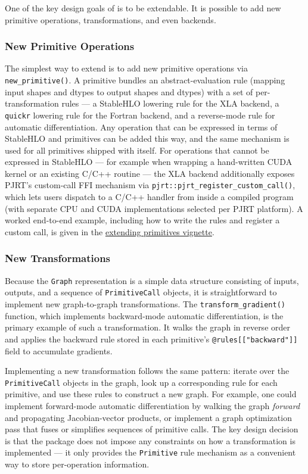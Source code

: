 One of the key design goals of  is to be extendable.
It is possible to add new primitive operations, transformations, and even backends.

\subsubsection{New Primitive Operations}\label{new-primitive-operations}

The simplest way to extend  is to add new primitive operations via \texttt{new\_primitive()}.
A primitive bundles an abstract-evaluation rule (mapping input shapes and dtypes to output shapes and dtypes) with a set of per-transformation rules --- a StableHLO lowering rule for the XLA backend, a \texttt{quickr} lowering rule for the Fortran backend, and a reverse-mode rule for automatic differentiation.
Any operation that can be expressed in terms of StableHLO and  primitives can be added this way, and the same mechanism is used for all primitives shipped with  itself.
For operations that cannot be expressed in StableHLO --- for example when wrapping a hand-written CUDA kernel or an existing C/C++ routine --- the XLA backend additionally exposes PJRT's custom-call FFI mechanism via \texttt{pjrt::pjrt\_register\_custom\_call()}, which lets users dispatch to a C/C++ handler from inside a compiled program (with separate CPU and CUDA implementations selected per PJRT platform).
A worked end-to-end example, including how to write the rules and register a custom call, is given in the \href{https://r-xla.github.io/anvl/articles/extending_primitive.html}{extending primitives vignette}.

\subsubsection{New Transformations}\label{new-transformations}

Because the \texttt{Graph} representation is a simple data structure consisting of inputs, outputs, and a sequence of \texttt{PrimitiveCall} objects, it is straightforward to implement new graph-to-graph transformations.
The \texttt{transform\_gradient()} function, which implements backward-mode automatic differentiation, is the primary example of such a transformation.
It walks the graph in reverse order and applies the backward rule stored in each primitive's \texttt{@rules{[}{[}"backward"{]}{]}} field to accumulate gradients.

Implementing a new transformation follows the same pattern: iterate over the \texttt{PrimitiveCall} objects in the graph, look up a corresponding rule for each primitive, and use these rules to construct a new graph.
For example, one could implement forward-mode automatic differentiation by walking the graph \emph{forward} and propagating Jacobian-vector products, or implement a graph optimization pass that fuses or simplifies sequences of primitive calls.
The key design decision is that the  package does not impose any constraints on how a transformation is implemented --- it only provides the \texttt{Primitive} rule mechanism as a convenient way to store per-operation information.

